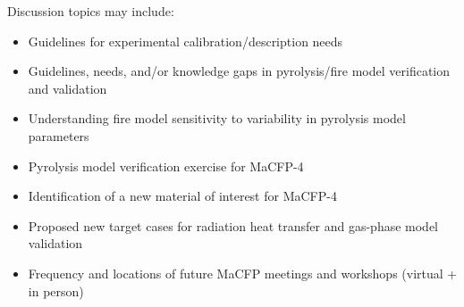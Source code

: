 \documentclass[12pt]{article}
\begin{document}
Discussion topics may include:
\begin{itemize}[noitemsep]%
\item Guidelines for experimental calibration/description needs
\item Guidelines, needs, and/or knowledge gaps in pyrolysis/fire model verification and validation
\item Understanding fire model sensitivity to variability in pyrolysis model parameters
\item Pyrolysis model verification exercise for MaCFP-4
\item Identification of a new material of interest for MaCFP-4
\item Proposed new target cases for radiation heat transfer and gas-phase model validation
\item Frequency and locations of future MaCFP meetings and workshops (virtual + in person)
\end{itemize}
\end{document}
